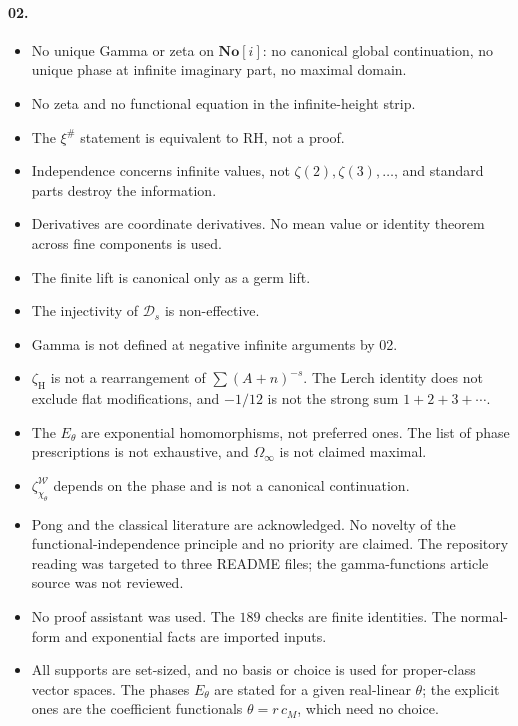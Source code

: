 \documentclass[11pt,a4paper]{article}
\numberwithin{equation}{section}
\theoremstyle{definition}
\theoremstyle{remark}
\newcommand{\No}{\mathbf{No}}
\newcommand{\zH}{\zeta_{\mathrm H}}
\newcommand{\xip}{\xi^{\#}}
\newcommand{\DD}{\mathcal D}
\newcommand{\Wing}{\mathcal W}
\newcommand{\Om}{\Omega_{\infty}}
\begin{document}
\paragraph{02.}
\begin{itemize}
\item No unique Gamma or zeta on $\No[i]$: no canonical global continuation, no
 unique phase at infinite imaginary part, no maximal domain.
\item No zeta and no functional equation in the infinite-height strip.
\item The $\xip$ statement is equivalent to RH, not a proof.
\item Independence concerns infinite values, not $\zeta(2),\zeta(3),\dots$,
 and standard parts destroy the information.
\item Derivatives are coordinate derivatives. No mean value or identity theorem
 across fine components is used.
\item The finite lift is canonical only as a germ lift.
\item The injectivity of $\DD_s$ is non-effective.
\item Gamma is not defined at negative infinite arguments by 02.
\item $\zH$ is not a rearrangement of $\sum(A+n)^{-s}$. The Lerch identity does
 not exclude flat modifications, and $-1/12$ is not the strong sum
 $1+2+3+\cdots$.
\item The $E_\theta$ are exponential homomorphisms, not preferred ones. The
 list of phase prescriptions is not exhaustive, and $\Om$ is not claimed
 maximal.
\item $\zeta^\Wing_{\chi_\theta}$ depends on the phase and is not a canonical
 continuation.
\item Pong and the classical literature are acknowledged. No novelty of the
 functional-independence principle and no priority are claimed. The
 repository reading was targeted to three README files; the gamma-functions
 article source was not reviewed.
\item No proof assistant was used. The $189$ checks are finite identities.
 The normal-form and exponential facts are imported inputs.
\item All supports are set-sized, and no basis or choice is used for
 proper-class vector spaces. The phases $E_\theta$ are stated for a given
 real-linear $\theta$; the explicit ones are the coefficient functionals
 $\theta=r\,c_M$, which need no choice.
\end{itemize}
\end{document}

